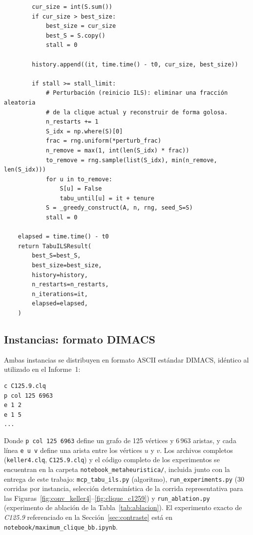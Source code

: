 {\begin{verbatim}
        cur_size = int(S.sum())
        if cur_size > best_size:
            best_size = cur_size
            best_S = S.copy()
            stall = 0

        history.append((it, time.time() - t0, cur_size, best_size))

        if stall >= stall_limit:
            # Perturbación (reinicio ILS): eliminar una fracción aleatoria
            # de la clique actual y reconstruir de forma golosa.
            n_restarts += 1
            S_idx = np.where(S)[0]
            frac = rng.uniform(*perturb_frac)
            n_remove = max(1, int(len(S_idx) * frac))
            to_remove = rng.sample(list(S_idx), min(n_remove, len(S_idx)))
            for u in to_remove:
                S[u] = False
                tabu_until[u] = it + tenure
            S = _greedy_construct(A, n, rng, seed_S=S)
            stall = 0

    elapsed = time.time() - t0
    return TabuILSResult(
        best_S=best_S,
        best_size=best_size,
        history=history,
        n_restarts=n_restarts,
        n_iterations=it,
        elapsed=elapsed,
    )
\end{verbatim}
}

\subsection{Instancias: formato DIMACS}

Ambas instancias se distribuyen en formato ASCII estándar DIMACS, idéntico al utilizado en el Informe~1:

{\small
\begin{verbatim}
c C125.9.clq
p col 125 6963
e 1 2
e 1 5
...
\end{verbatim}
}

Donde \texttt{p col 125 6963} define un grafo de 125 vértices y 6\,963 aristas, y cada línea \texttt{e u v} define una arista entre los vértices $u$ y $v$. Los archivos completos (\texttt{keller4.clq}, \texttt{C125.9.clq}) y el código completo de los experimentos se encuentran en la carpeta \texttt{notebook\_metaheuristica/}, incluida junto con la entrega de este trabajo: \texttt{mcp\_tabu\_ils.py} (algoritmo), \texttt{run\_experiments.py} (30 corridas por instancia, selección determinística de la corrida representativa para las Figuras~\ref{fig:conv_keller4}--\ref{fig:clique_c1259}) y \texttt{run\_ablation.py} (experimento de ablación de la Tabla~\ref{tab:ablacion}). El experimento exacto de \textit{C125.9} referenciado en la Sección~\ref{sec:contraste} está en \texttt{notebook/maximum\_clique\_bb.ipynb}.
